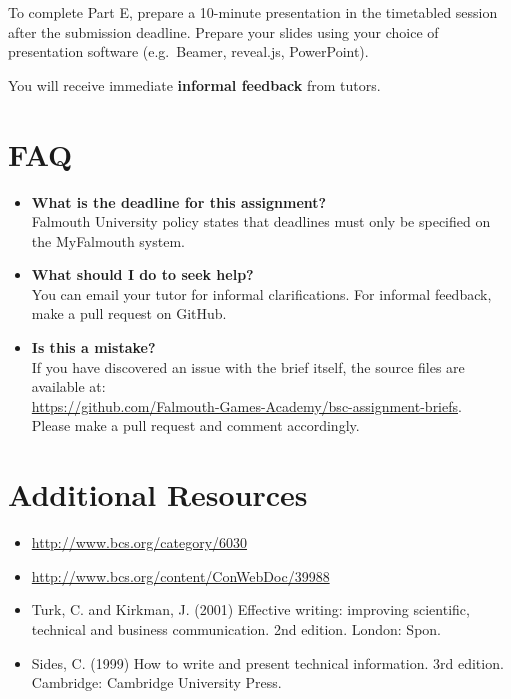 To complete Part E, prepare a 10-minute presentation in the timetabled session after the submission deadline.
Prepare your slides using your choice of presentation software (e.g.\ Beamer, reveal.js, PowerPoint).

You will receive immediate \textbf{informal feedback} from tutors.

\section*{FAQ}

\begin{itemize}
	\item 	\textbf{What is the deadline for this assignment?} \\ 
    		Falmouth University policy states that deadlines must only be specified on the MyFalmouth system.
    		
	\item 	\textbf{What should I do to seek help?} \\ 
    		You can email your tutor for informal clarifications. For informal feedback, make a pull request on GitHub. 
    		
    	\item 	\textbf{Is this a mistake?} \\ 	
    		If you have discovered an issue with the brief itself, the source files are available at: \\
    		\url{https://github.com/Falmouth-Games-Academy/bsc-assignment-briefs}.\\
    		 Please make a pull request and comment accordingly.
\end{itemize}

\section*{Additional Resources}

\begin{itemize}
   \item \url{http://www.bcs.org/category/6030}
   \item \url{http://www.bcs.org/content/ConWebDoc/39988}
   \item Turk, C. and Kirkman, J. (2001) Effective writing: improving scientific, technical and business communication. 2nd edition. London: Spon.
   \item Sides, C. (1999) How to write and present technical information. 3rd edition. Cambridge: Cambridge University Press.
   
   
\end{itemize}

